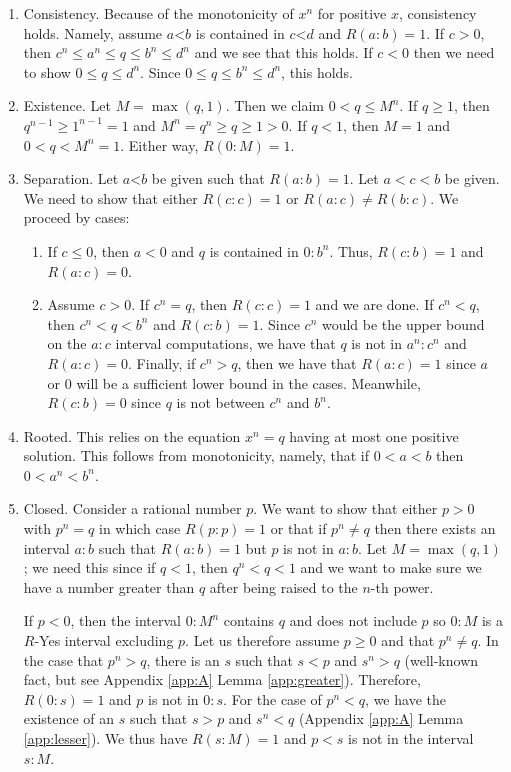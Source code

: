 \documentclass[12pt]{article}
\theoremstyle{remark}
\newcommand{\lt}{\mathord{<}}
\begin{document}
\begin{enumerate}
    \item Consistency. Because of the monotonicity of $x^n$ for positive $x$, consistency holds. Namely, assume $a\lt b$ is contained in $c \lt d$ and $R(a:b)=1$. If $c>0$, then $c^n \leq a^n \leq q \leq b^n \leq d^n$ and we see that this holds. If $c<0$ then we need to show $0 \leq q \leq d^n$. Since $0 \leq q \leq  b^n \leq d^n$, this holds. 
    \item Existence. Let $M = \max(q, 1)$. Then we claim $0 < q \leq M^n$. If $q \geq 1$, then $q^{n-1} \geq 1^{n-1} = 1$ and $M^n = q^n \geq q \geq 1 > 0$. If $ q < 1$, then $M=1$ and $0 < q < M^n = 1$. Either way, $R(0:M) = 1$. 
    \item Separation. Let $a\lt b$ be given such that $R(a:b)=1$. Let $a < c <b$ be given. We need to show that either $R(c:c) = 1$ or $R(a:c) \neq R(b:c)$. We proceed by cases:
    \begin{enumerate}
        \item If $c \leq 0$, then $a<0$ and $q$ is contained in $0:b^n$. Thus, $R(c:b) = 1$ and $R(a:c) = 0$. 
        \item Assume $c>0$. If $c^n = q$, then $R(c:c)=1$ and we are done. If $c^n < q$, then $c^n < q< b^n$ and $R(c:b)=1$. Since $c^n$ would be the upper bound on the $a:c$ interval computations, we have that $q$ is not in $a^n:c^n$ and $R(a:c)=0$. Finally, if $c^n > q$, then we have that $R(a:c)=1$ since $a$ or $0$ will be a sufficient lower bound in the cases. Meanwhile, $R(c:b) = 0$ since $q$ is not between $c^n$ and $b^n$. 
    \end{enumerate}
     \item Rooted. This relies on the equation $x^n = q$ having at most one positive solution. This follows from monotonicity, namely, that if $ 0 < a < b$ then $0 < a^n < b^n$. 
    \item Closed. Consider a rational number $p$. We want to show that either $p>0$ with $p^n = q$ in which case $R(p:p)=1$ or that if $p^n \neq q$ then there exists an interval $a:b$ such that $R(a:b)=1$ but $p$ is not in $a:b$. Let $M = \max(q, 1)$; we need this since if $q<1$, then $q^n < q < 1$ and we want to make sure we have a number greater than $q$ after being raised to the $n$-th power. 
    
    If $p < 0$, then the interval $0:M^n$ contains $q$ and does not include $p$ so $0:M$ is a $R$-Yes interval excluding $p$. Let us therefore assume $p \geq 0$ and that $p^n \neq q$. In the case that $p^n > q$, there is an $s$ such that $s<p$ and $s^n > q$ (well-known fact, but see Appendix \ref{app:A} Lemma \ref{app:greater}). Therefore, $R(0:s) = 1$ and $p$ is not in $0:s$. For the case of $p^n < q$, we have the existence of an $s$ such that $s > p$ and $s^n < q$ (Appendix \ref{app:A} Lemma \ref{app:lesser}). We thus have $R(s:M)=1$ and $p < s$ is not in the interval $s:M$. 
    
\end{enumerate}
\end{document}
